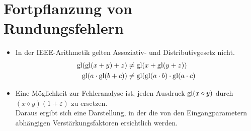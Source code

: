 
    \section{Fortpflanzung von Rundungsfehlern} %
        \begin{itemize}
        	\item In der IEEE-Arithmetik gelten Assoziativ- und Distributivgesetz nicht.
            	\begin{align*}
            		\operatorname{gl}(\operatorname{gl}(x + y) + z)     & \neq \operatorname{gl}(x + \operatorname{gl}(y + z))                     \\
            		\operatorname{gl}(a \cdot \operatorname{gl}(b + c)) & \neq \operatorname{gl}(\operatorname{gl}(a \cdot b) \cdot \operatorname{gl}(a \cdot c)
            	\end{align*}
			\item Eine Möglichkeit zur Fehleranalyse ist, jeden Ausdruck \( \operatorname{gl}(x \diamond y) \) durch \( (x \diamond y)(1 + \varepsilon) \) zu ersetzen. \\ Daraus ergibt sich eine Darstellung, in der die von den Eingangparametern abhängigen Verstärkungsfaktoren ersichtlich werden.
        \end{itemize}

